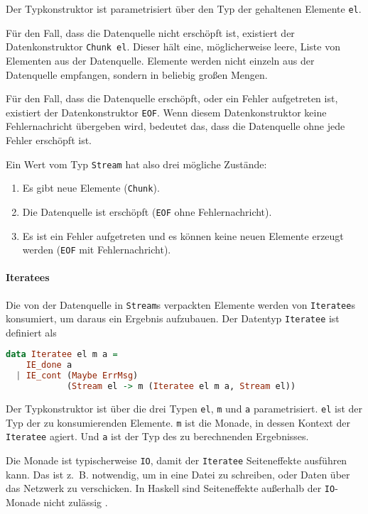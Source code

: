 \documentclass[draft=false
              ,paper=a4
              ,twoside=false
              ,fontsize=11pt
              ,headsepline
              ,BCOR10mm
              ,DIV11
              ]{scrbook}
\begin{document}
Der Typkonstruktor ist parametrisiert über den Typ der gehaltenen Elemente \lstinline|el|.

Für den Fall, dass die Datenquelle nicht erschöpft ist, existiert der Datenkonstruktor \lstinline|Chunk el|.
Dieser hält eine, möglicherweise leere, Liste von Elementen aus der Datenquelle.
Elemente werden nicht einzeln aus der Datenquelle empfangen, sondern in beliebig großen Mengen.

Für den Fall, dass die Datenquelle erschöpft, oder ein Fehler aufgetreten ist, existiert der Datenkonstruktor \lstinline|EOF|.
Wenn diesem Datenkonstruktor keine Fehlernachricht übergeben wird, bedeutet das, dass die Datenquelle ohne jede Fehler erschöpft ist.

Ein Wert vom Typ \lstinline|Stream| hat also drei mögliche Zustände:
\begin{enumerate}
  \item Es gibt neue Elemente (\lstinline|Chunk|).
  \item Die Datenquelle ist erschöpft (\lstinline|EOF| ohne Fehlernachricht).
  \item Es ist ein Fehler aufgetreten und es können keine neuen Elemente erzeugt werden (\lstinline|EOF| mit Fehlernachricht).
\end{enumerate}



\paragraph{Iteratees} %
\label{par:iteratees}\mbox{} %

Die von der Datenquelle in \lstinline|Stream|s verpackten Elemente werden von \lstinline|Iteratee|s konsumiert, um daraus ein Ergebnis aufzubauen.
Der Datentyp \lstinline|Iteratee| ist definiert als
\begin{lstlisting}[language=Haskell]
data Iteratee el m a =
    IE_done a
  | IE_cont (Maybe ErrMsg)
            (Stream el -> m (Iteratee el m a, Stream el))
\end{lstlisting}

Der Typkonstruktor ist über die drei Typen \lstinline|el|, \lstinline|m| und \lstinline|a| parametrisiert.
\lstinline|el| ist der Typ der zu konsumierenden Elemente.
\lstinline|m| ist die Monade, in dessen Kontext der \lstinline|Iteratee| agiert.
Und \lstinline|a| ist der Typ des zu berechnenden Ergebnisses.

Die Monade ist typischerweise \lstinline|IO|, damit der \lstinline|Iteratee| Seiteneffekte ausführen kann.
Das ist z.~B. notwendig, um in eine Datei zu schreiben, oder Daten über das Netzwerk zu verschicken.
In Haskell sind Seiteneffekte außerhalb der \lstinline|IO|-Monade nicht zulässig \cite[vgl.][]{haskell_io}.
\end{document}
